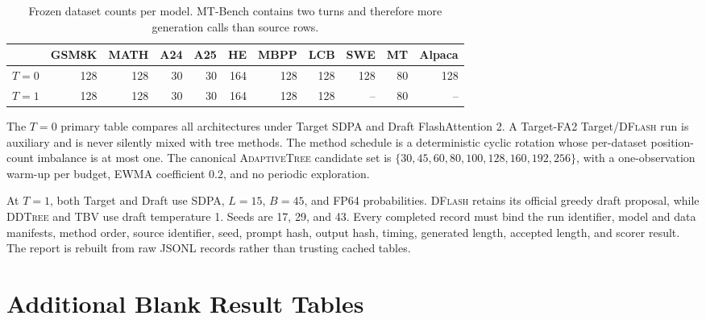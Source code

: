 \documentclass{article}
\newcommand{\TBV}{\textnormal{\textsc{TBV}}}
\newcommand{\AdaptiveTree}{\textnormal{\textsc{AdaptiveTree}}}
\newcommand{\DFlash}{\textnormal{\textsc{DFlash}}}
\newcommand{\DDTree}{\textnormal{\textsc{DDTree}}}
\begin{document}
\begin{table}[h]
\centering
\caption{Frozen dataset counts per model.  MT-Bench contains two turns and therefore more generation calls than source rows.}
\small
\begin{tabular}{lrrrrrrrrrr}
\toprule
 & GSM8K & MATH & A24 & A25 & HE & MBPP & LCB & SWE & MT & Alpaca \\
\midrule
$T=0$ & 128 & 128 & 30 & 30 & 164 & 128 & 128 & 128 & 80 & 128 \\
$T=1$ & 128 & 128 & 30 & 30 & 164 & 128 & 128 & -- & 80 & -- \\
\bottomrule
\end{tabular}
\end{table}

The $T=0$ primary table compares all architectures under Target SDPA and Draft FlashAttention 2.  A Target-FA2 Target/\DFlash{} run is auxiliary and is never silently mixed with tree methods.  The method schedule is a deterministic cyclic rotation whose per-dataset position-count imbalance is at most one.  The canonical \AdaptiveTree{} candidate set is $\{30,45,60,80,100,128,160,192,256\}$, with a one-observation warm-up per budget, EWMA coefficient $0.2$, and no periodic exploration.

At $T=1$, both Target and Draft use SDPA, $L=15$, $B=45$, and FP64 probabilities.  \DFlash{} retains its official greedy draft proposal, while \DDTree{} and \TBV{} use draft temperature 1.  Seeds are 17, 29, and 43.  Every completed record must bind the run identifier, model and data manifests, method order, source identifier, seed, prompt hash, output hash, timing, generated length, accepted length, and scorer result.  The report is rebuilt from raw JSONL records rather than trusting cached tables.

\section{Additional Blank Result Tables}
\label{app:blanktables}


\end{document}
